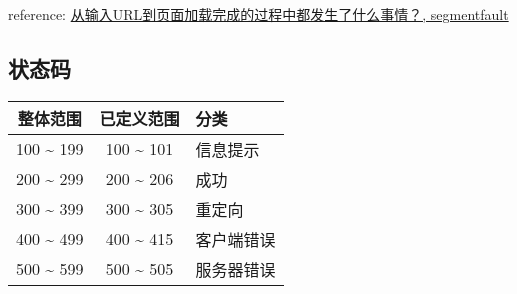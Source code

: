 reference:
\href{http://segmentfault.com/q/1010000000489803/a-1020000000489830}{从输入URL到页面加载完成的过程中都发生了什么事情？,
segmentfault}

\subsection{状态码}\label{ux72b6ux6001ux7801}

\begin{longtable}[]{@{}ccl@{}}
\toprule
整体范围 & 已定义范围 & 分类\tabularnewline
\midrule
\endhead
100 \textasciitilde{} 199 & 100 \textasciitilde{} 101 &
信息提示\tabularnewline
200 \textasciitilde{} 299 & 200 \textasciitilde{} 206 &
成功\tabularnewline
300 \textasciitilde{} 399 & 300 \textasciitilde{} 305 &
重定向\tabularnewline
400 \textasciitilde{} 499 & 400 \textasciitilde{} 415 &
客户端错误\tabularnewline
500 \textasciitilde{} 599 & 500 \textasciitilde{} 505 &
服务器错误\tabularnewline
\bottomrule
\end{longtable}

